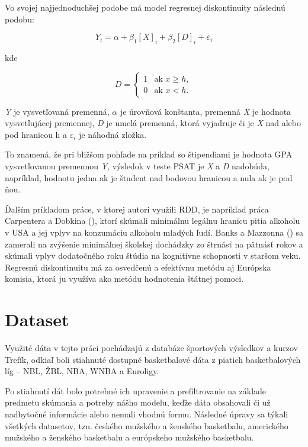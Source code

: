 \documentclass[
  digital, %
  oneside, %
  notable,   %
  lof,     %
  lot,     %
]{fithesis3}
\begin{document}
		Vo svojej najjednoduchšej podobe má model regresnej diskontinuity následnú podobu:
		
		\begin{equation}
		Y_{i} = \alpha + \beta _{1} [\textit{X}]_{i} + \beta _{2} [\textit{D}]_{i} + \varepsilon_{i}
		\end{equation}
		
		kde 
		
		 \begin{equation}
		D = \begin{cases}
		1 & \text{ak }x\geq{h}, \\
		0 & \text{ak }x < {h}.
		\end{cases}
		\end{equation}
		
		\textit{Y} je vysvetľovaná premenná, $\alpha$ je úrovňová konštanta, premenná \textit{X} je hodnota vysvetľujúcej premennej, \textit{D} je umelá premenná, ktorá vyjadruje či je \textit{X} nad alebo pod hranicou h a $\varepsilon_{i}$ je náhodná zložka. 
		
		To znamená, že pri bližšom pohľade na príklad so štipendiami je hodnota GPA vysvetľovanou premennou \textit{Y}, výsledok v teste PSAT je \textit{X} a \textit{D} nadobúda, napríklad, hodnotu jedna ak je študent nad bodovou hranicou a nula ak je pod ňou.
	
		Ďalším príkladom práce, v ktorej autori využili RDD, je napríklad práca Carpentera a Dobkina (\citeyear{carpenter2011}), ktorí skúmali minimálnu legálnu hranicu pitia alkoholu v USA a jej vplyv na konzumáciu alkoholu mladých ľudí. Banks a Mazzonna (\citeyear{banks2012}) sa zamerali na zvýšenie minimálnej školskej dochádzky zo štrnásť na pätnásť rokov a skúmali vplyv dodatočného roku štúdia na kognitívne schopnosti v staršom veku. Regresnú diskontinuitu má za osvedčenú a efektívnu metódu aj Európska komisia, ktorá ju využíva ako metódu hodnotenia štátnej pomoci. \parencite[s.~20]{ek2014} 
		
		\section{Dataset}
		Využité dáta v tejto práci pochádzajú z databáze športových výsledkov a kurzov Trefík, odkiaľ boli stiahnuté dostupné basketbalové dáta z piatich basketbalových líg – NBL, ŽBL, NBA, WNBA a Euroligy. \parencite{trefik}
		
		Po stiahnutí dát bolo potrebné ich upravenie a prefiltrovanie na základe predmetu skúmania a potreby nášho modelu, keďže dáta obsahovali či už nadbytočné informácie alebo nemali vhodnú formu. Následné úpravy sa týkali všetkých datasetov, tzn. českého mužského a ženského basketbalu, amerického mužského a ženského basketbalu a európskeho mužského basketbalu.
		
\end{document}
